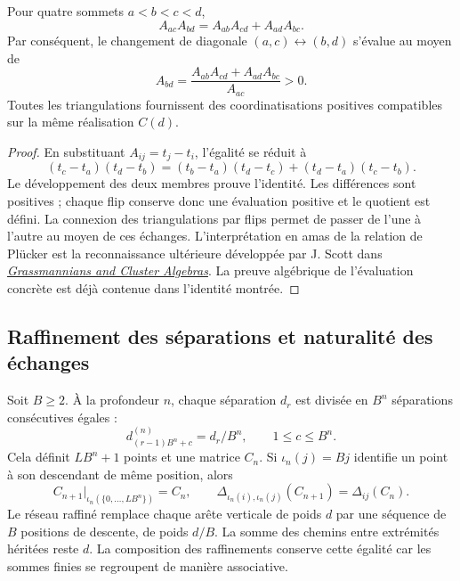\begin{theorem}
\label{thm:nc-ptolemy}
Pour quatre sommets \(a<b<c<d\),
\begin{equation}
 A_{ac}A_{bd}=A_{ab}A_{cd}+A_{ad}A_{bc}.
 \label{eq:nc-ptolemy}
\end{equation}
Par conséquent, le changement de diagonale \((a,c)\leftrightarrow(b,d)\)
s’évalue au moyen de
\[
 A_{bd}=\frac{A_{ab}A_{cd}+A_{ad}A_{bc}}{A_{ac}}>0.
\]
Toutes les triangulations fournissent des coordinatisations positives compatibles sur la même réalisation \(C(d)\).
\end{theorem}
\begin{proof}
En substituant \(A_{ij}=t_j-t_i\), l’égalité se réduit à
\[
 (t_c-t_a)(t_d-t_b)
 =(t_b-t_a)(t_d-t_c)+(t_d-t_a)(t_c-t_b).
\]
Le développement des deux membres prouve l’identité. Les différences sont
positives ; chaque flip conserve donc une évaluation positive et le
quotient est défini. La connexion des triangulations par flips
permet de passer de l’une à l’autre au moyen de ces échanges. L’interprétation
en amas de la relation de Plücker est la reconnaissance ultérieure développée
par J. Scott dans
\href{https://arxiv.org/abs/math/0311148}{\emph{Grassmannians and Cluster
Algebras}}. La preuve algébrique de l’évaluation concrète est déjà contenue
dans l’identité montrée.
\end{proof}

\subsection{Raffinement des séparations et naturalité des échanges}

Soit \(B\ge2\). À la profondeur \(n\), chaque séparation \(d_r\) est divisée
en \(B^n\) séparations consécutives égales :
\[
 d^{(n)}_{(r-1)B^n+c}=d_r/B^n,
 \qquad 1\le c\le B^n.
\]
Cela définit \(LB^n+1\) points et une matrice \(C_n\). Si \(\iota_n(j)=Bj\) identifie un point à son descendant de même position, alors
\begin{equation}
 C_{n+1}|_{\iota_n(\{0,\ldots,LB^n\})}=C_n,
 \qquad
 \Delta_{\iota_n(i),\iota_n(j)}(C_{n+1})=\Delta_{ij}(C_n).
 \label{eq:nc-refinement}
\end{equation}
Le réseau raffiné remplace chaque arête verticale de poids \(d\) par une
séquence de \(B\) positions de descente, de poids \(d/B\). La somme
des chemins entre extrémités héritées reste \(d\). La composition des
raffinements conserve cette égalité car les sommes finies se regroupent
de manière associative.


